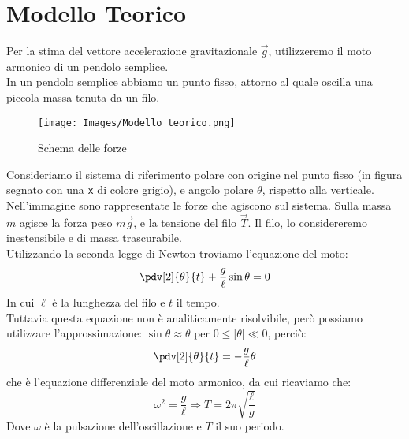 

\section{Modello Teorico}
Per la stima del vettore accelerazione gravitazionale $\vec{g}$, utilizzeremo il moto armonico di un pendolo semplice.\\

In un pendolo semplice abbiamo un punto fisso, attorno al quale oscilla una piccola massa tenuta da un filo.\\
\begin{figure}[h]
    \centering
    \texttt{[image: Images/Modello teorico.png]}
    \caption{Schema delle forze}
    \label{fig:modello teorico}
\end{figure}
Consideriamo il sistema di riferimento polare con origine nel punto fisso (in figura segnato con una \verb|x| di colore grigio), e angolo polare $\theta$, rispetto alla verticale.\\
Nell'immagine  sono rappresentate le forze che agiscono sul sistema.
Sulla massa $m$ agisce la forza peso $m\vec{g}$, e la tensione del filo $\Vec{T}$.
Il filo, lo considereremo inestensibile e di massa trascurabile.\\

Utilizzando la seconda legge di Newton troviamo l'equazione del moto:
\begin{equation}\label{equazione del moto}
    \pdv[2]{\theta}{t} + \frac{g}{\ell} \sin\theta = 0
\end{equation}
In cui $\ell$ è la lunghezza del filo e $t$ il tempo.\\

Tuttavia questa equazione non è analiticamente risolvibile, però possiamo utilizzare l'approssimazione: $\sin\theta \approx \theta$ per $0 \leq |\theta| \ll 0$, perciò:
\begin{equation}
    \pdv[2]{\theta}{t} = -\frac{g}{\ell}\theta
\end{equation}
che è l'equazione differenziale del moto armonico, da cui ricaviamo che:
$$\omega^2 = \frac{g}{\ell} \Rightarrow T = 2\pi \sqrt{\frac{\ell}{g}}$$
Dove $\omega$ è la pulsazione dell'oscillazione e $T$ il suo periodo.\\

